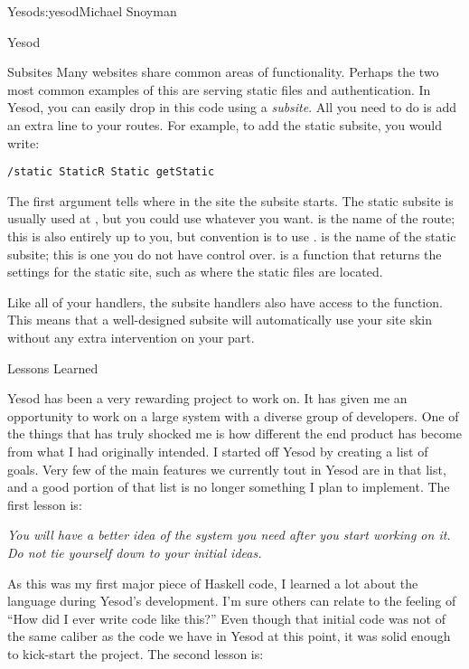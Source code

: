 \begin{aosachapter}{Yesod}{s:yesod}{Michael Snoyman}
\begin{aosasect1}{Yesod}
\begin{aosasect2}{Subsites}
Many websites share common areas of functionality. Perhaps the two
most common examples of this are serving static files and
authentication. In Yesod, you can easily drop in this code using a
\emph{subsite}. All you need to do is add an extra line to your
routes. For example, to add the static subsite, you would write:

\begin{verbatim}
/static StaticR Static getStatic
\end{verbatim}

The first argument tells where in the site the subsite starts. The
static subsite is usually used at , but you could use whatever
you want.  is the name of the route; this is also entirely up
to you, but convention is to use .  is the name of the
static subsite; this is one you do not have control
over.  is a function that returns the settings for the
static site, such as where the static files are located.

Like all of your handlers, the subsite handlers also have access to
the  function. This means that a well-designed
subsite will automatically use your site skin without any extra
intervention on your part.

\end{aosasect2}

\end{aosasect1}

\begin{aosasect1}{Lessons Learned}

Yesod has been a very rewarding project to work on. It has given me an
opportunity to work on a large system with a diverse group of
developers. One of the things that has truly shocked me is how
different the end product has become from what I had originally
intended. I started off Yesod by creating a list of goals. Very few of
the main features we currently tout in Yesod are in that list, and a
good portion of that list is no longer something I plan to
implement. The first lesson is:

\emph{You will have a better idea of the system you need after you
  start working on it. Do not tie yourself down to your initial
  ideas.}

As this was my first major piece of Haskell code, I learned a lot
about the language during Yesod's development. I'm sure others can
relate to the feeling of ``How did I ever write code like this?'' Even
though that initial code was not of the same caliber as the code we
have in Yesod at this point, it was solid enough to kick-start the
project. The second lesson is:


\end{aosasect1}
\end{aosachapter}
